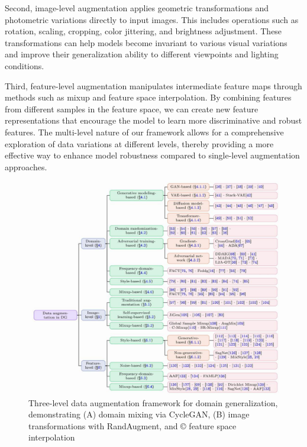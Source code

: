 \documentclass[manuscript,screen,review]{acmart}
\begin{document}
Second, image-level augmentation applies geometric transformations and photometric variations directly to input images. This includes operations such as rotation, scaling, cropping, color jittering, and brightness adjustment. These transformations can help models become invariant to various visual variations and improve their generalization ability to different viewpoints and lighting conditions.

Third, feature-level augmentation manipulates intermediate feature maps through methods such as mixup and feature space interpolation. By combining features from different samples in the feature space, we can create new feature representations that encourage the model to learn more discriminative and robust features. The multi-level nature of our framework allows for a comprehensive exploration of data variations at different levels, thereby providing a more effective way to enhance model robustness compared to single-level augmentation approaches.

\begin{figure}[htb]
\centering
\includegraphics[width=0.8\linewidth]{picture/2.1.pdf}
\caption{Three-level data augmentation framework for domain generalization, demonstrating (A) domain mixing via CycleGAN, (B) image transformations with RandAugment, and © feature space interpolation}
\label{fig:augmentation_framework}
\end{figure}
\end{document}
